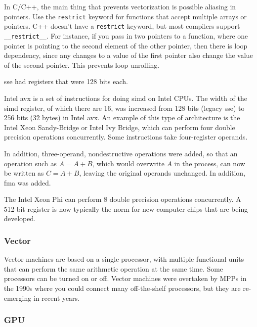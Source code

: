 \documentclass[10pt]{article}
\newcounter{subsubsubsection}[subsubsection]
\begin{document}
\begin{flushleft}
In C/C++, the main thing that prevents vectorization is possible aliasing in pointers. Use the {\tt restrict} keyword for functions that accept multiple arrays or pointers. C++ doesn't have a {\tt restrict} keyword, but most compilers support {\tt \_\_restrict\_\_}. For instance, if you pass in two pointers to a function, where one pointer is pointing to the second element of the other pointer, then there is loop dependency, since any changes to a value of the first pointer also change the value of the second pointer. This prevents loop unrolling.


\gls{sse} had registers that were 128 bits each. 


Intel \gls{avx} is a set of instructions for doing \gls{simd} on Intel CPUs. The width of the \gls{simd} register, of which there are 16, was increased from 128 bits (legacy \gls{sse}) to 256 bits (32 bytes) in Intel \gls{avx}. An example of this type of architecture is the Intel Xeon Sandy-Bridge or Intel Ivy Bridge, which can perform four double precision operations concurrently. Some instructions take four-register operands. 

In addition, three-operand, nondestructive operations were added, so that an operation such as \(A=A+B\), which would overwrite \(A\) in the process, can now be written as \(C=A+B\), leaving the original operands unchanged. In addition, \gls{fma} was added. 


The Intel Xeon Phi can perform 8 double precision operations concurrently. A 512-bit register is now typically the norm for new computer chips that are being developed.

\subsubsection{Vector}

Vector machines are based on a single processor, with multiple functional units that can perform the same arithmetic operation at the same time. Some processors can be turned on or off. Vector machines were overtaken by MPPs in the 1990s where you could connect many off-the-shelf processors, but they are re-emerging in recent years. 

\subsubsection{GPU}


\end{flushleft}
\end{document}
